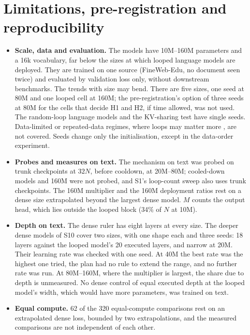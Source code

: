 \section{Limitations, pre-registration and reproducibility}
\label{sec:limitations}

\begin{itemize}
  \item \textbf{Scale, data and evaluation.} The models have 10M--160M parameters and a 16k vocabulary, far below the
  sizes at which looped language models are deployed. They are trained on one source (FineWeb-Edu, no document seen
  twice) and evaluated by validation loss only, without downstream benchmarks. The trends with size may bend. There are
  five sizes, one seed at 80M and one looped cell at 160M; the pre-registration's option of three seeds at 80M for the
  cells that decide H1 and H2, if time allowed, was not used. The random-loop language models and the KV-sharing test
  have single seeds. Data-limited or repeated-data regimes, where loops may matter more
  \citep{chen2026growth,gulbahar2026squeezing}, are not covered. Seeds change only the initialisation, except in the
  data-order experiment.
  \item \textbf{Probes and measures on text.} The mechanism on text was probed on trunk checkpoints at $32N$, before
  cooldown, at 20M--80M; cooled-down models and 160M were not probed, and S1's loop-count sweep also uses trunk
  checkpoints. The 160M multiplier and the 160M deployment ratios rest on a dense size extrapolated beyond the largest
  dense model. $M$ counts the output head, which lies outside the looped block (34\% of $N$ at 10M).
  \item \textbf{Depth on text.} The dense ruler has eight layers at every size. The deeper dense models of S10 cover two
  sizes, with one shape each and three seeds: 18 layers against the looped model's 20 executed layers, and narrow at
  20M. Their learning rate was checked with one seed. At 40M the best rate was the highest one tried, the plan had no
  rule to extend the range, and no further rate was run. At 80M--160M, where the multiplier is largest, the share due to
  depth is unmeasured. No dense control of equal executed depth at the looped model's width, which would have more
  parameters, was trained on text.
  \item \textbf{Equal compute.} 62 of the 320 equal-compute comparisons rest on an extrapolated dense loss, bounded by two
  extrapolations, and the measured comparisons are not independent of each other.

\end{itemize}
